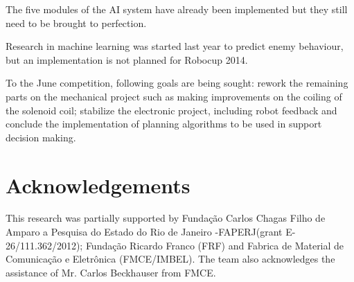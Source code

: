 \documentclass{llncs}
\begin{document}
The five modules of the AI system have already been implemented but they still
need to be brought to perfection.

Research in machine learning was started last year to predict enemy behaviour,
but an implementation is not planned for Robocup 2014.

To the June competition, following goals are being sought:
rework the remaining parts on the mechanical project such as making improvements on the coiling of the solenoid coil;
stabilize the electronic project, including robot feedback and
conclude the implementation of planning algorithms to be used in support decision making.

\section*{Acknowledgements}
This research was partially supported by Fundação Carlos Chagas Filho de Amparo a Pesquisa do Estado do Rio de Janeiro -FAPERJ(grant E-26/111.362/2012); Fundação Ricardo Franco (FRF) and Fabrica de Material de Comunicação e Eletrônica (FMCE/IMBEL). The team also acknowledges the assistance of Mr. Carlos Beckhauser from FMCE.
\end{document}
